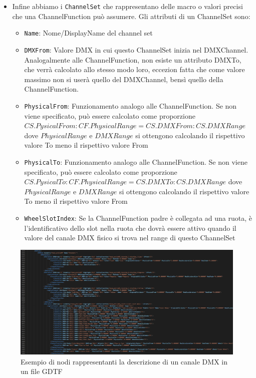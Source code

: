 \documentclass[main.tex]{subfiles}
\begin{document}
\begin{itemize}
\begin{itemize}
        \end{itemize}
    \item Infine abbiamo i \lstinline{ChannelSet} che rappresentano delle macro o valori precisi che una ChannelFunction può assumere. Gli attributi di un ChannelSet sono: \begin{itemize}
            \item \lstinline{Name}: Nome/DisplayName del channel set
            \item \lstinline{DMXFrom}: Valore DMX in cui questo ChannelSet inizia nel DMXChannel. Analogalmente alle ChannelFunction, non esiste un attributo DMXTo, che verrà calcolato allo stesso modo loro, eccezion fatta che come valore massimo non si userà quello del DMXChannel, bensì quello della ChannelFunction. 
            \item \lstinline{PhysicalFrom}: Funzionamento analogo alle ChannelFunction. Se non viene specificato, può essere calcolato come proporzione \begin{math}CS.PysicalFrom : CF.PhysicalRange = CS.DMXFrom : CS.DMXRange\end{math} dove $PhysicalRange$ e $DMXRange$ si ottengono calcolando il rispettivo valore To meno il rispettivo valore From
            \item \lstinline{PhysicalTo}: Funzionamento analogo alle ChannelFunction. Se non viene specificato, può essere calcolato come proporzione \begin{math}CS.PysicalTo : CF.PhysicalRange = CS.DMXTo : CS.DMXRange\end{math} dove $PhysicalRange$ e $DMXRange$ si ottengono calcolando il rispettivo valore To meno il rispettivo valore From
            \item \lstinline{WheelSlotIndex}: Se la ChannelFunction padre è collegata ad una ruota, è l'identificativo dello slot nella ruota che dovrà essere attivo quando il valore del canale DMX fisico si trova nel range di questo ChannelSet 
        \end{itemize}
\end{itemize}
\begin{figure}[H]
    \centering
    \includegraphics[width=1\linewidth]{img/introduzione/GDTFdmxExample.jpg}
    \caption{Esempio di nodi rappresentanti la descrizione di un canale DMX in un file GDTF}
    \label{fig:1_gdtfDmxExample}
\end{figure}
\end{document}

